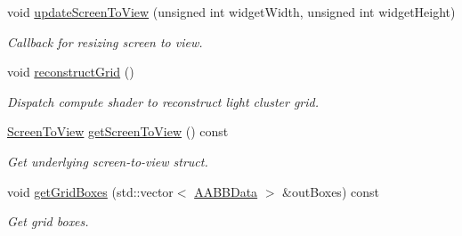 \begin{Indent}
\begin{DoxyCompactItemize}
void \mbox{\hyperlink{classrev_1_1_light_cluster_grid_ad2baee2b0a8c8bc0a64a9c2cc40a5c13}{update\+Screen\+To\+View}} (unsigned int widget\+Width, unsigned int widget\+Height)
\begin{DoxyCompactList}\small\item\em Callback for resizing screen to view. \end{DoxyCompactList}\item 
\mbox{\label{classrev_1_1_light_cluster_grid_ac62336ae11737a1a3244b6a786a999fb}} 
void \mbox{\hyperlink{classrev_1_1_light_cluster_grid_ac62336ae11737a1a3244b6a786a999fb}{reconstruct\+Grid}} ()
\begin{DoxyCompactList}\small\item\em Dispatch compute shader to reconstruct light cluster grid. \end{DoxyCompactList}\item 
\mbox{\label{classrev_1_1_light_cluster_grid_a18f0cce1bf198428b694c056a56fdcad}} 
\mbox{\hyperlink{structrev_1_1_light_cluster_grid_1_1_screen_to_view}{Screen\+To\+View}} \mbox{\hyperlink{classrev_1_1_light_cluster_grid_a18f0cce1bf198428b694c056a56fdcad}{get\+Screen\+To\+View}} () const
\begin{DoxyCompactList}\small\item\em Get underlying screen-\/to-\/view struct. \end{DoxyCompactList}\item 
\mbox{\label{classrev_1_1_light_cluster_grid_af4fbd09016c00c4d3502331417531215}} 
void \mbox{\hyperlink{classrev_1_1_light_cluster_grid_af4fbd09016c00c4d3502331417531215}{get\+Grid\+Boxes}} (std\+::vector$<$ \mbox{\hyperlink{structrev_1_1_a_a_b_b_data}{A\+A\+B\+B\+Data}} $>$ \&out\+Boxes) const
\begin{DoxyCompactList}\small\item\em Get grid boxes. \end{DoxyCompactList}\end{DoxyCompactItemize}
\end{Indent}
